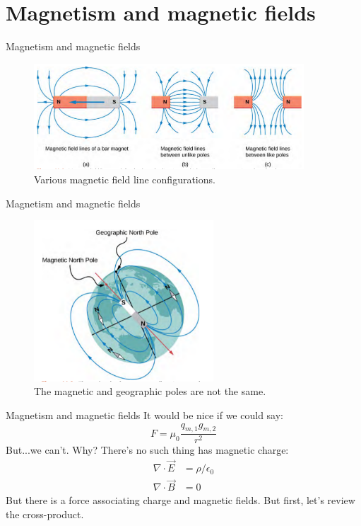 \documentclass{beamer}
\begin{document}
\section{Magnetism and magnetic fields}

\begin{frame}{Magnetism and magnetic fields}
\begin{figure}
\centering
\includegraphics[width=0.9\textwidth,trim=0cm 1cm 0cm 0cm,clip=true]{figures/fields1.png}
\caption{\label{fields1} Various magnetic field line configurations.}
\end{figure}
\end{frame}

\begin{frame}{Magnetism and magnetic fields}
\begin{figure}
\centering
\includegraphics[width=0.6\textwidth,trim=0cm 0.1cm 0cm 0cm,clip=true]{figures/fields2.png}
\caption{\label{fields2} The magnetic and geographic poles are not the same.}
\end{figure}
\end{frame}

\begin{frame}{Magnetism and magnetic fields}
It would be nice if we could say:
\begin{equation}
F = \mu_0 \frac{q_{m,1} g_{m,2}}{r^2}
\end{equation}
But...we can't.  Why?  There's no such thing has magnetic charge:
\begin{align}
\nabla \cdot \vec{E} &= \rho/\epsilon_0 \\ 
\nabla \cdot \vec{B} &= 0
\end{align}
But there is a force associating charge and magnetic fields.  But first, let's review the cross-product.
\end{frame}
\end{document}
